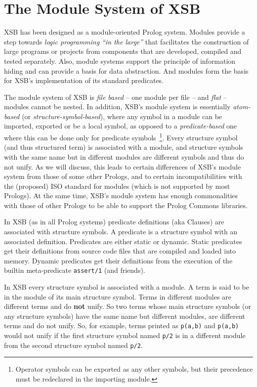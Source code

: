 
\section{The Module System of XSB} \label{Modules}

XSB has been designed as a module-oriented Prolog system.  Modules
provide a step towards {\em logic programming ``in the large''} that
facilitates the construction of large programs or projects from
components that are developed, compiled and tested separately.  Also,
module systems support the principle of information hiding and can
provide a basis for data abstraction.  And modules form the basis for
XSB's implementation of its standard predicates.

The module system of XSB is {\em file based} -- one module per file --
and {\em flat} -- modules cannot be nested.  In addition, XSB's module
system is essentially {\em atom-based} (or {\em
  structure-symbol-based}), where any symbol in a module can be
imported, exported or be a local symbol, as opposed to a {\em
  predicate-based} one where this can be done only for predicate
symbols~\footnote{Operator symbols can be exported as any other
  symbols, but their precedence must be redeclared in the importing
  module.}.  Every structure symbol (and thus structured term) is
associated with a module, and structure symbols with the same name but
in different modules are different symbols and thus do not unify.  As
we will discuss, this leads to certain differences of XSB's module
system from those of some other Prologs, and to certain
incompatibilities with the (proposed) ISO standard for modules (which
is not supported by most Prologs).  At the same time, XSB's module
system has enough commonalities with those of other Prologs to be able
to support the Prolog Commons libraries.

In XSB (as in all Prolog systems) predicate definitions (aka Clauses)
are associated with structure symbols.  A predicate is a structure
symbol with an associated definition.  Predicates are either static or
dynamic.  Static predicates get their definitions from source code
files that are compiled and loaded into memory.  Dynamic predicates
get their definitions from the execution of the builtin meta-predicate
{\tt assert/1} (and friends).

In XSB every structure symbol is associated with a module.  A term is
said to be in the module of its main structure symbol.  Terms in
different modules are different terms and do {\bf not} unify.  So two
terms whose main structure symbols (or any structure symbols) have the
same name but different modules, are different terms and do not unify.
So, for example, terms printed as {\tt p(a,b)} and {\tt p(a,b)} would
not unify if the first structure symbol named {\tt p/2} is in a
different module from the second structure symbol named {\tt p/2}.

